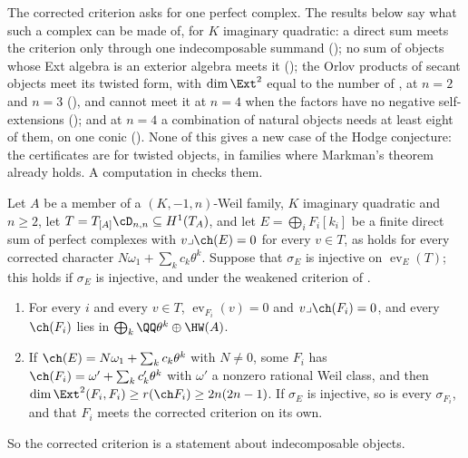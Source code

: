 The corrected criterion asks for one perfect complex. The results below say
what such a complex can be made of, for $K$ imaginary quadratic: a direct sum
meets the criterion only through one indecomposable summand
(); no sum of objects whose Ext algebra is an
exterior algebra meets it (); the Orlov products of
secant objects meet its twisted form, with $\dim\Ext^{2}$ equal to the number
of , at $n=2$ and $n=3$ (), and
cannot meet it at $n=4$ when the factors have no negative self-extensions
(); and at $n=4$ a combination of natural objects needs
at least eight of them, on one conic (). None of
this gives a new case of the Hodge conjecture: the certificates are for
twisted objects, in families where Markman's theorem already holds. A computation in \cite{BMB26} checks them.

\begin{lemma}
\label{lem:p2primesummands}
Let $A$ be a member of a $(K,-1,n)$-Weil family, $K$ imaginary quadratic and
$n\ge2$, let $T=T_{[A]}\cD_{n,n}\subseteq H^{1}(T_{A})$, and let
$E=\bigoplus_{i}F_{i}[k_{i}]$ be a finite direct sum of perfect complexes with
$v\lrcorner\ch(E)=0$ for every $v\in T$, as holds for every corrected character
$N\omega_{1}+\sum_{k}c_{k}\theta^{k}$. Suppose that $\sigma_{E}$ is injective on
$\operatorname{ev}_{E}(T)$; this holds if $\sigma_{E}$ is injective, and under
the weakened criterion of \cite[Question 11.4]{Mar25b}.
\begin{enumerate}[label=\textup{(\roman*)},leftmargin=2.6em,itemsep=2pt]
\item For every $i$ and every $v\in T$, $\operatorname{ev}_{F_{i}}(v)=0$ and
  $v\lrcorner\ch(F_{i})=0$, and every $\ch(F_{i})$ lies in
  $\bigoplus_{k}\QQ\theta^{k}\oplus\HW(A)$.
\item If $\ch(E)=N\omega_{1}+\sum_{k}c_{k}\theta^{k}$ with $N\ne0$, some
  $F_{i}$ has $\ch(F_{i})=\omega'+\sum_{k}c'_{k}\theta^{k}$ with $\omega'$ a
  nonzero rational Weil class, and then
  $\dim\Ext^{2}(F_{i},F_{i})\ge r(\ch F_{i})\ge2n(2n-1)$. If $\sigma_{E}$ is
  injective, so is every $\sigma_{F_{i}}$, and that $F_{i}$ meets the corrected
  criterion on its own.
\end{enumerate}
So the corrected criterion is a statement about indecomposable objects.
\end{lemma}

